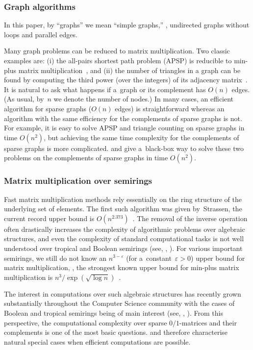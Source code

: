 \subsubsection{Graph algorithms}
%
%
%
%
In this paper, by ``graphs'' we mean ``simple graphs,'' \ie,
undirected graphs without loops and parallel edges.

Many graph problems can be reduced to matrix multiplication.
Two classic examples are: (i) the all-pairs shortest path problem (APSP) is
reducible to min-plus matrix multiplication~\cite{DBLP:conf/focs/FischerM71},
and (ii) the number of triangles in %
a %
graph can be found by
computing the third power (over the integers) of its adjacency
matrix~\cite{Itai_Rodeh_siam,Williams2009TriangleDV}.
It is natural to ask what happens if a~graph
or its complement %
%
has $O(n)$ edges.  %
%
(As usual, by~$n$ we denote the number of nodes.)
In many cases, an efficient algorithm
for sparse graphs ($O(n)$ edges) is straightforward
whereas an algorithm with the same efficiency for
the %
complements of sparse graphs
%
%
%
%
is not. For
example, it is easy to solve APSP and triangle counting on sparse graphs in
time $O(n^2)$, but achieving the same time complexity for
the %
complements of sparse
graphs is more complicated.
 and  give
a~black-box way to solve these two problems on
the %
complements of sparse graphs in
time $O(n^2)$.

\subsubsection{Matrix multiplication over semirings}  Fast matrix
multiplication methods rely essentially on the ring structure of the underlying
set of elements. The first such algorithm was given by~Strassen,
the current record upper bound is
$O(n^{2.373})$~\cite{DBLP:conf/stoc/Williams12, DBLP:conf/issac/Gall14a}.
The removal of the inverse operation often drastically increases the complexity
of algorithmic problems over algebraic structures, and even the complexity of
standard computational tasks %
is  %
not well understood over tropical and
Boolean semirings (see, \eg, \cite{Williams14,GrigorievP15}).
For various important semirings,
we still do not know an $n^{3-\varepsilon}$ (for a~constant~$\varepsilon>0$)
upper bound for matrix multiplication, \eg, the strongest known upper bound for
min-plus matrix multiplication is $n^3/\exp(\sqrt{\log n})$~\cite{Williams14}.

The interest in computations over such algebraic structures has
recently %
grown  %
substantially throughout the Computer Science community
%
%
%
with the cases of Boolean and
tropical semirings being of main interest (see,
\eg, \cite{Jukna16,Williams14,butkovic10systems}).
From this perspective, the %
computational %
complexity over %
sparse $0/1$-matrices and their complements %
is one of the most basic questions.
 and 
therefore characterise natural special
cases when efficient computations are possible.

